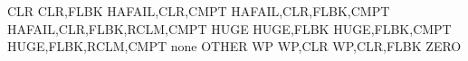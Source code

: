 CLR
CLR,FLBK
HAFAIL,CLR,CMPT
HAFAIL,CLR,FLBK,CMPT
HAFAIL,CLR,FLBK,RCLM,CMPT
HUGE
HUGE,FLBK
HUGE,FLBK,CMPT
HUGE,FLBK,RCLM,CMPT
none
OTHER
WP
WP,CLR
WP,CLR,FLBK
ZERO
